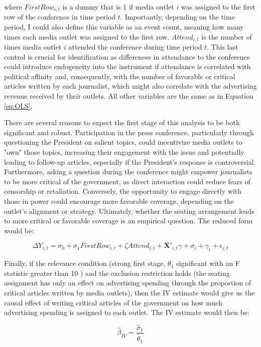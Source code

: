 \noindent where $FirstRow_{i, t}$ is a dummy that is 1 if media outlet $i$ was assigned to the first row of the conference in time period $t$. Importantly, depending on the time period, I could also define this variable as an event count, meaning how many times each media outlet was assigned to the first row. $Attend_{i, t}$ is the number of times media outlet $i$ attended the conference during time period $t$. This last control is crucial for identification as differences in attendance to the conference could introduce endogeneity into the instrument if attendance is correlated with political affinity and, consequently, with the number of favorable or critical articles written by each journalist, which might also correlate with the advertising revenue received by their outlets. All other variables are the same as in Equation \ref{eq:OLS}.

There are several reasons to expect the first stage of this analysis to be both significant and robust. Participation in the press conference, particularly through questioning the President on salient topics, could incentivize media outlets to "own" those topics, increasing their engagement with the issue and potentially leading to follow-up articles, especially if the President's response is controversial. Furthermore, asking a question during the conference might empower journalists to be more critical of the government, as direct interaction could reduce fears of censorship or retaliation. Conversely, the opportunity to engage directly with those in power could encourage more favorable coverage, depending on the outlet's alignment or strategy. Ultimately, whether the seating arrangement leads to more critical or favorable coverage is an empirical question. The reduced form would be:

$$\Delta Y_{i, t} = \sigma_0 + \sigma_1 FirstRow_{i, t} + \zeta Attend_{i, t} + \mathbf{X'}_{i,t}\gamma + \sigma_i + \gamma_t + \epsilon_{i, t}$$

Finally, if the relevance condition (strong first stage, $\theta_1$ significant with an F statistic greater than 10 \citep{Yogo-Weak-IIEM}) and the exclusion restriction holds (the seating assignment has only an effect on advertising spending through the proportion of critical articles written by media outlets), then the IV estimate would give us the causal effect of writing critical articles of the government on how much advertising spending is assigned to each outlet. The IV estimate would then be: 

$$\hat{\beta}_{IV} = \frac{\hat{\sigma}_1}{\hat{\theta}_1} $$
